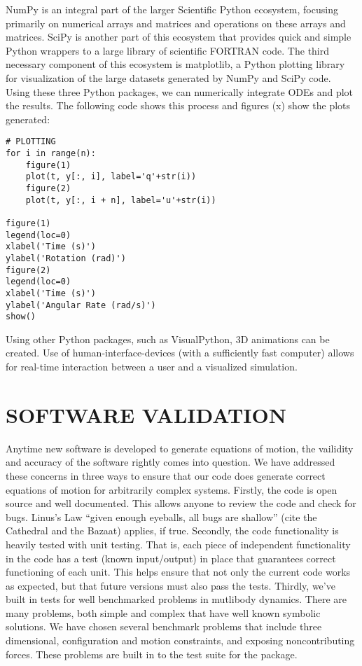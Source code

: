 \documentclass[twocolumn,10pt]{asme2e}
\begin{document}
NumPy is an integral part of the larger Scientific Python ecosystem, focusing
primarily on numerical arrays and matrices and operations on these arrays and
matrices.
SciPy is another part of this ecosystem that provides quick and simple Python
wrappers to a large library of scientific FORTRAN code.
The third necessary component of this ecosystem is matplotlib, a Python
plotting library for visualization of the large datasets generated by NumPy and
SciPy code.
Using these three Python packages, we can numerically integrate ODEs and plot
the results.
The following code shows this process and figures (x) show the plots generated:

\begin{figure*}
\begin{Verbatim}[frame=single]
# PLOTTING
for i in range(n):
    figure(1)
    plot(t, y[:, i], label='q'+str(i))
    figure(2)
    plot(t, y[:, i + n], label='u'+str(i))

figure(1)
legend(loc=0)
xlabel('Time (s)')
ylabel('Rotation (rad)')
figure(2)
legend(loc=0)
xlabel('Time (s)')
ylabel('Angular Rate (rad/s)')
show()
\end{Verbatim}
\end{figure*}

Using other Python packages, such as VisualPython, 3D animations can be
created.
Use of human-interface-devices (with a sufficiently fast computer) allows for
real-time interaction between a user and a visualized simulation.

\section*{SOFTWARE VALIDATION}
Anytime new software is developed to generate equations of motion, the
vailidity and accuracy of the software rightly comes into question. We have
addressed these concerns in three ways to ensure that our code does generate
correct equations of motion for arbitrarily complex systems. Firstly, the code
is open source and well documented. This allows anyone to review the code and
check for bugs. Linus's Law ``given enough eyeballs, all bugs
are shallow'' (cite the Cathedral and the Bazaat) applies, if true.
Secondly, the code functionality is heavily tested with unit testing.  That is,
each piece of independent functionality in the code has a test (known
input/output) in place that guarantees correct functioning of each unit. This
helps ensure that not only the current code works as expected, but that future
versions must also pass the tests. Thirdly, we've built in tests for well
benchmarked problems in mutlibody dynamics. There are many problems, both
simple and complex that have well known symbolic solutions. We have chosen
several benchmark problems that include three dimensional, configuration and
motion constraints, and exposing noncontributing forces. These problems are
built in to the test suite for the package.
\end{document}
